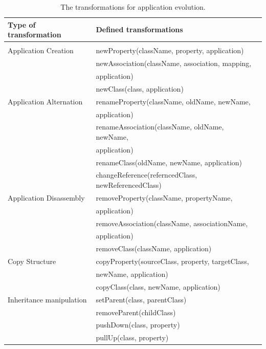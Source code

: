 \documentclass[runningheads]{comsis}
\begin{document}
\begin{table}
\caption{The transformations for application evolution.}
	\label{tab:app-evolution}
\centering
	\begin{tabular}{ll}
	\hline
	Type of transformation & Defined transformations \\
	\hline
	\\[-2ex] 
	Application Creation
	& newProperty(className, property, application) \\
	& newAssociation(className, association, mapping, \\ &  \hspace{0.5in}application) \\
	&  newClass(class, application) \\
	Application Alternation
		& renameProperty(className, oldName, newName, \\ &  \hspace{0.5in} application) \\
		& renameAssociation(className, oldName, newName, \\ &  \hspace{0.5in}application) \\
		& renameClass(oldName, newName, application)\\
		& changeReference(referncedClass, newReferencedClass) \\
		Application Disassembly 
		& removeProperty(className, propertyName,\\ &  \hspace{0.5in} application) \\
		& removeAssociation(className, associationName, \\ &  \hspace{0.5in}application) \\
		& removeClass(className, application)\\
	Copy Structure
		& copyProperty(sourceClass, property, targetClass,\\ &  \hspace{0.5in} newName, application)  \\
		& copyClass(class, newName, application) \\
	Inheritance manipulation   & setParent(class, parentClass) \\
		& removeParent(childClass) \\
		& pushDown(class, property)\\
		& pullUp(class, property)\\
	\hline
	\end{tabular}
\end{table}
\end{document}
